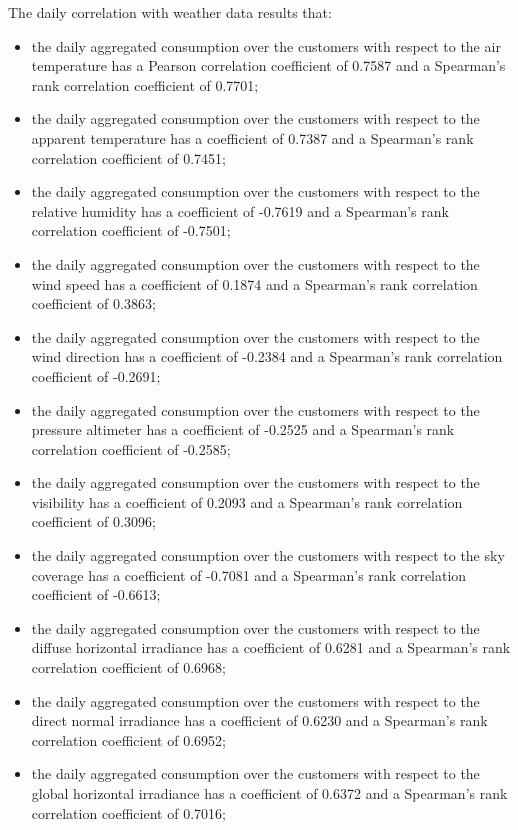 The daily correlation with weather data results that:
\begin{itemize}
  \item the daily aggregated consumption over the customers with respect to the air temperature has a Pearson correlation coefficient of 0.7587 and a Spearman's rank correlation coefficient of 0.7701;
  \item the daily aggregated consumption over the customers with respect to the apparent temperature has a coefficient of 0.7387 and a Spearman's rank correlation coefficient of 0.7451;
  \item the daily aggregated consumption over the customers with respect to the relative humidity has a coefficient of -0.7619 and a Spearman's rank correlation coefficient of -0.7501;
  \item the daily aggregated consumption over the customers with respect to the wind speed has a coefficient of 0.1874 and a Spearman's rank correlation coefficient of 0.3863;
  \item the daily aggregated consumption over the customers with respect to the wind direction has a coefficient of -0.2384 and a Spearman's rank correlation coefficient of -0.2691;
  \item the daily aggregated consumption over the customers with respect to the pressure altimeter has a coefficient of -0.2525 and a Spearman's rank correlation coefficient of -0.2585;
  \item the daily aggregated consumption over the customers with respect to the visibility has a coefficient of 0.2093 and a Spearman's rank correlation coefficient of 0.3096;
  \item the daily aggregated consumption over the customers with respect to the sky coverage has a coefficient of -0.7081 and a Spearman's rank correlation coefficient of -0.6613;
  \item the daily aggregated consumption over the customers with respect to the diffuse horizontal irradiance has a coefficient of 0.6281 and a Spearman's rank correlation coefficient of 0.6968;
  \item the daily aggregated consumption over the customers with respect to the direct normal irradiance has a coefficient of 0.6230 and a Spearman's rank correlation coefficient of 0.6952;
  \item the daily aggregated consumption over the customers with respect to the global horizontal irradiance has a coefficient of 0.6372 and a Spearman's rank correlation coefficient of 0.7016;

\end{itemize}
